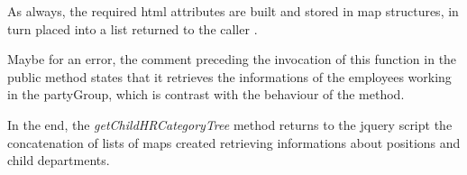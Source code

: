 As always, the required html attributes are built and stored in map structures, in turn placed into a list returned to the caller
.

Maybe for an error, the comment preceding the invocation of this function in the public method states that it retrieves the informations of the employees working in the partyGroup, which is contrast with the behaviour of the method.

In the end, the \textit{getChildHRCategoryTree} method returns to the jquery script the concatenation of lists of maps created retrieving informations about positions and child departments.
